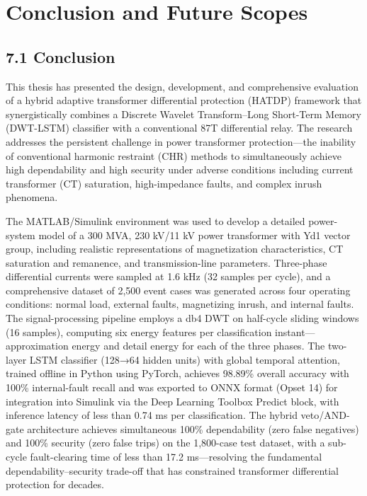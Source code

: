 \chapter{Conclusion and Future Scopes}
\label{ch:conclusion}


\section{7.1  Conclusion}
This thesis has presented the design, development, and comprehensive evaluation of a hybrid adaptive transformer differential protection (HATDP) framework that synergistically combines a Discrete Wavelet Transform--Long Short-Term Memory (DWT-LSTM) classifier with a conventional 87T differential relay. The research addresses the persistent challenge in power transformer protection---the inability of conventional harmonic restraint (CHR) methods to simultaneously achieve high dependability and high security under adverse conditions including current transformer (CT) saturation, high-impedance faults, and complex inrush phenomena.

The MATLAB/Simulink environment was used to develop a detailed power-system model of a 300 MVA, 230 kV/11 kV power transformer with Yd1 vector group, including realistic representations of magnetization characteristics, CT saturation and remanence, and transmission-line parameters. Three-phase differential currents were sampled at 1.6 kHz (32 samples per cycle), and a comprehensive dataset of 2,500 event cases was generated across four operating conditions: normal load, external faults, magnetizing inrush, and internal faults. The signal-processing pipeline employs a db4 DWT on half-cycle sliding windows (16 samples), computing six energy features per classification instant---approximation energy and detail energy for each of the three phases. The two-layer LSTM classifier (128→64 hidden units) with global temporal attention, trained offline in Python using PyTorch, achieves 98.89\% overall accuracy with 100\% internal-fault recall and was exported to ONNX format (Opset 14) for integration into Simulink via the Deep Learning Toolbox Predict block, with inference latency of less than 0.74 ms per classification. The hybrid veto/AND-gate architecture achieves simultaneous 100\% dependability (zero false negatives) and 100\% security (zero false trips) on the 1,800-case test dataset, with a sub-cycle fault-clearing time of less than 17.2 ms---resolving the fundamental dependability--security trade-off that has constrained transformer differential protection for decades.


